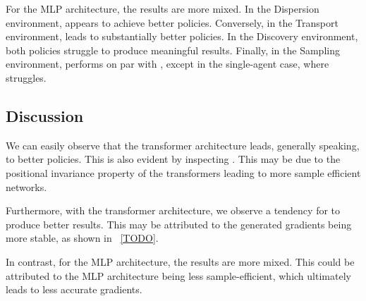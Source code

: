 For the MLP architecture, the results are more mixed. In the Dispersion environment, \fname{} appears to achieve better policies. Conversely, in the Transport environment, \fnamer{} leads to substantially better policies. In the Discovery environment, both policies struggle to produce meaningful results. Finally, in the Sampling environment, \fname{} performs on par with \fnamer{}, except in the single-agent case, where \fnamer{} struggles.

\subsection{Discussion}
We can easily observe that the transformer architecture leads, generally speaking, to better policies. This is also evident by inspecting . This may be due to the positional invariance property of the transformers leading to more sample efficient networks. 

Furthermore, with the transformer architecture, we observe a tendency for \fname{} to produce better results. This may be attributed to the generated gradients being more stable, as shown in ~\cref{TODO}.

In contrast, for the MLP architecture, the results are more mixed. This could be attributed to the MLP architecture being less sample-efficient, which ultimately leads to less accurate gradients.


